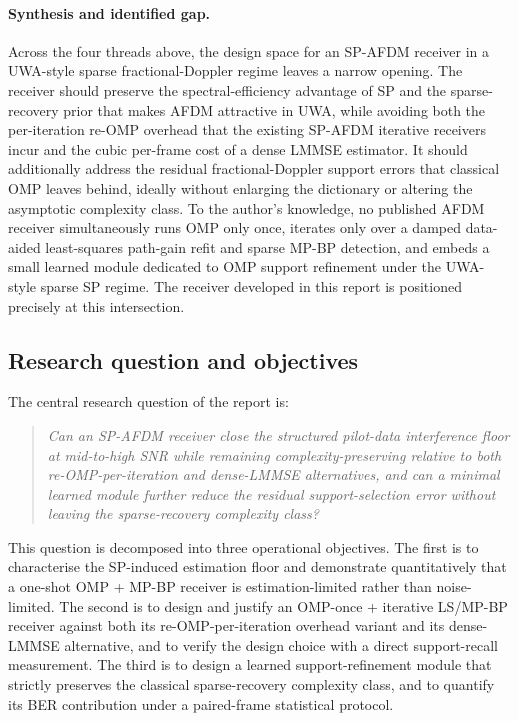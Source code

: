 \paragraph{Synthesis and identified gap.}
Across the four threads above, the design space for an SP-AFDM receiver in
a UWA-style sparse fractional-Doppler regime leaves a narrow opening. The
receiver should preserve the spectral-efficiency advantage of SP and the
sparse-recovery prior that makes AFDM attractive in UWA, while avoiding
both the per-iteration re-OMP overhead that the existing SP-AFDM iterative
receivers incur and the cubic per-frame cost of a dense LMMSE estimator.
It should additionally address the residual fractional-Doppler support
errors that classical OMP leaves behind, ideally without enlarging the
dictionary or altering the asymptotic complexity class. To the author's
knowledge, no published AFDM receiver simultaneously runs OMP only once,
iterates only over a damped data-aided least-squares path-gain refit and
sparse MP-BP detection, and embeds a small learned module dedicated to OMP
support refinement under the UWA-style sparse SP regime. The receiver
developed in this report is positioned precisely at this intersection.


\subsection{Research question and objectives}
\label{ssec:rq}

The central research question of the report is:
\begin{quote}
\emph{Can an SP-AFDM receiver close the structured pilot-data interference
floor at mid-to-high SNR while remaining complexity-preserving relative to both
re-OMP-per-iteration and dense-LMMSE alternatives, and can a minimal learned
module further reduce the residual support-selection error without leaving the
sparse-recovery complexity class?}
\end{quote}

This question is decomposed into three operational objectives. The first is to
characterise the SP-induced estimation floor and demonstrate quantitatively
that a one-shot OMP + MP-BP receiver is estimation-limited rather than
noise-limited. The second is to design and justify an OMP-once + iterative
LS/MP-BP receiver against both its re-OMP-per-iteration overhead variant and
its dense-LMMSE alternative, and to verify the design choice with a direct
support-recall measurement. The third is to design a learned
support-refinement module that strictly preserves the classical
sparse-recovery complexity class, and to quantify its BER contribution under
a paired-frame statistical protocol.


